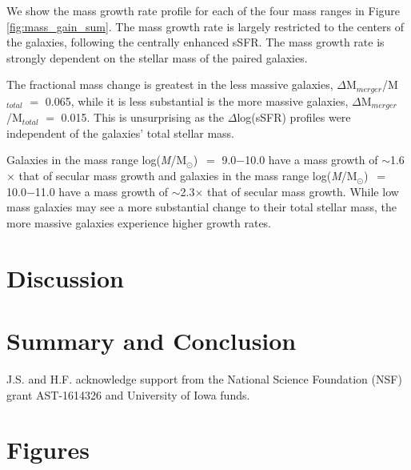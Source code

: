 \documentclass[iop,revtex4,twocolumn,apj,numberedappendix,appendixfloats]{emulateapj}
\newcommand{\logm}{log({\it M}/M$_{\odot}$)}
\begin{document}
We show the mass growth rate profile for each of the four mass ranges in Figure \ref{fig:mass_gain_sum}. The mass growth rate is largely restricted to the centers of the galaxies, following the centrally enhanced sSFR. The mass growth rate is strongly dependent on the stellar mass of the paired galaxies. 

The fractional mass change is greatest in the less massive galaxies, $\Delta$M$_{merger}$/M$_{total}$ $=$ 0.065, while it is less substantial is the more massive galaxies, $\Delta$M$_{merger}$/M$_{total}$ $=$ 0.015. This is unsurprising as the $\Delta$log(sSFR) profiles were independent of the galaxies' total stellar mass. 

Galaxies in the mass range \logm\ $=$ 9.0$-$10.0 have a mass growth of $\sim$1.6$\times$ that of secular mass growth and galaxies in the mass range \logm\ $=$ 10.0$-$11.0 have a mass growth of $\sim$2.3$\times$ that of secular mass growth. While low mass galaxies may see a more substantial change to their total stellar mass, the more massive galaxies experience higher growth rates.

\section{Discussion}\label{sec:discussion}


\section{Summary and Conclusion}\label{sec:sum}






\acknowledgments

J.S. and H.F. acknowledge support from the National Science Foundation (NSF) grant AST-1614326 and University of Iowa funds. 





\hbox{}\clearpage

\appendix

\section{Figures}
\end{document}

